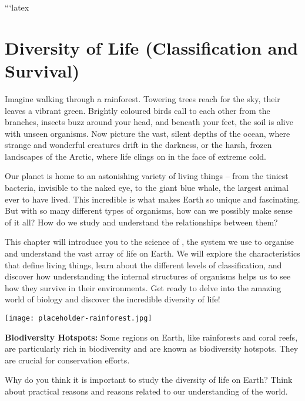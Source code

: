 ```latex
\chapter{Diversity of Life (Classification and Survival)}

\FloatBarrier
\1

Imagine walking through a rainforest. Towering trees reach for the sky, their leaves a vibrant green. Brightly coloured birds call to each other from the branches, insects buzz around your head, and beneath your feet, the soil is alive with unseen organisms. Now picture the vast, silent depths of the ocean, where strange and wonderful creatures drift in the darkness, or the harsh, frozen landscapes of the Arctic, where life clings on in the face of extreme cold.

Our planet is home to an astonishing variety of living things – from the tiniest bacteria, invisible to the naked eye, to the giant blue whale, the largest animal ever to have lived. This incredible  is what makes Earth so unique and fascinating.  But with so many different types of organisms, how can we possibly make sense of it all? How do we study and understand the relationships between them?

This chapter will introduce you to the science of , the system we use to organise and understand the vast array of life on Earth. We will explore the characteristics that define living things, learn about the different levels of classification, and discover how understanding the internal structures of organisms helps us to see how they survive in their environments.  Get ready to delve into the amazing world of biology and discover the incredible diversity of life!

\begin{marginfigure}
\texttt{[image: placeholder-rainforest.jpg]}
\end{marginfigure}

\begin{marginnote}
\textbf{Biodiversity Hotspots:} Some regions on Earth, like rainforests and coral reefs, are particularly rich in biodiversity and are known as biodiversity hotspots. They are crucial for conservation efforts.
\end{marginnote}

\begin{stopandthink}
Why do you think it is important to study the diversity of life on Earth?  Think about practical reasons and reasons related to our understanding of the world.
\end{stopandthink}


